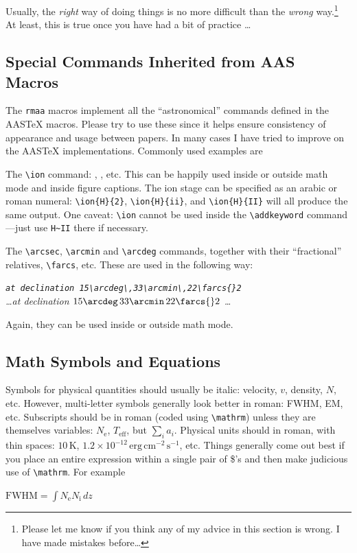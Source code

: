 \documentclass[debug]{rmaa}
\newcommand{\CS}[1]{\texttt{\textbackslash #1}}
\newenvironment{Example}
{\begin{list}{}{\setlength{\leftmargin}{10pt}\setlength{\rightmargin}{10pt}}%
  \item[]\itshape}
  {\end{list}}
\begin{document}
Usually, the \emph{right} way of doing things is no more difficult
than the \emph{wrong} way.\footnote{Please let me know if you think
  any of my advice in this section is wrong. I have made mistakes
  before\dots} At least, this is true once you have had a bit of
practice \dots


\subsection{Special Commands Inherited from AAS Macros}
\label{sec:command}

The \texttt{rmaa} macros implement all the ``astronomical'' commands
defined in the AAS\TeX{} macros. Please try to use these since it
helps ensure consistency of appearance and usage between papers. In
many cases I have tried to improve on the AAS\TeX{}
implementations. Commonly used examples are 
\begin{enumerate}
\item The \CS{ion} command: , , etc. This can
  be happily used inside or outside math mode and inside figure
  captions. The ion stage can be specified as an arabic or roman
  numeral: \verb+\ion{H}{2}+, \verb+\ion{H}{ii}+, and
  \verb+\ion{H}{II}+ will all produce the same output. One caveat:
  \CS{ion} cannot be used inside the \CS{addkeyword} command---just
  use \verb+H~II+ there if necessary.
\item The \CS{arcsec}, \CS{arcmin} and \CS{arcdeg} commands, together
  with their ``fractional'' relatives, \CS{farcs}, etc. These are used
  in the following way: 
  \begin{Example}
    \verb|at declination 15\arcdeg\,33\arcmin\,22\farcs{}2|\\
    \dots at declination $15\arcdeg\,33\arcmin\,22\farcs{}2$ \dots
  \end{Example}
  Again, they can be used inside or outside math mode. 
\end{enumerate}


\subsection{Math Symbols and Equations}
\label{sec:math}

Symbols for physical quantities should usually be italic: velocity,
$v$, density, $N$, etc. However, multi-letter symbols generally look
better in roman: FWHM, EM, etc. Subscripts should be in roman (coded
using \CS{mathrm}) unless they are themselves variables:
$N_\mathrm{e}$, $T_\mathrm{eff}$, but $\sum_i a_i$. Physical units
should in roman, with thin spaces: $10\,\mathrm{K}$, $1.2\times
10^{-12} \,\mathrm{erg\,cm^{-2}\,s^{-1}}$, etc. Things generally come
out best if you place an entire expression within a single pair of
\$'s and then make judicious use of \CS{mathrm}. For example
\begin{Example}
  $ \mathrm{FWHM} = \int N_\mathrm{e} N_\mathrm{i} \, dz $ 
\end{Example}
\end{document}

